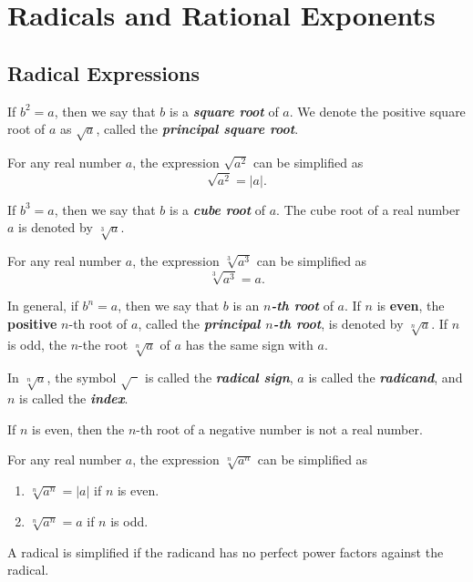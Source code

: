 
\hypertarget{radicals-and-rational-exponents}{%
\section{Radicals and Rational
Exponents}\label{radicals-and-rational-exponents}}

\hypertarget{radical-expressions}{%
\subsection{Radical Expressions}\label{radical-expressions}}

If \(b^2=a\), then we say that \(b\) is a \textbf{\emph{square root}} of
\(a\). We denote the positive square root of \(a\) as \(\sqrt{a}\),
called the \textbf{\emph{principal square root}}.

For any real number \(a\), the expression \(\sqrt{a^2}\) can be
simplified as \[
\sqrt{a^2}=|a|.
\]

If \(b^3=a\), then we say that \(b\) is a \textbf{\emph{cube root}} of
\(a\). The cube root of a real number \(a\) is denoted by
\(\sqrt[3]{a}\).

For any real number \(a\), the expression \(\sqrt[3]{a^3}\) can be
simplified as \[
\sqrt[3]{a^3}=a.
\]

In general, if \(b^n=a\), then we say that \(b\) is an
\textbf{\emph{\(n\)-th root}} of \(a\). If \(n\) is \textbf{even}, the
\textbf{positive} \(n\)-th root of \(a\), called the
\textbf{\emph{principal \(n\)-th root}}, is denoted by \(\sqrt[n]{a}\).
If \(n\) is odd, the \(n\)-the root \(\sqrt[n]{a}\) of \(a\) has the
same sign with \(a\).

In \(\sqrt[n]{a}\), the symbol \(\sqrt{\phantom{a}}\) is called the
\textbf{\emph{radical sign}}, \(a\) is called the
\textbf{\emph{radicand}}, and \(n\) is called the \textbf{\emph{index}}.

If \(n\) is even, then the \(n\)-th root of a negative number is not a
real number.

For any real number \(a\), the expression \(\sqrt[n]{a^n}\) can be
simplified as

\begin{enumerate}[sepno]
\item
  \(\sqrt[n]{a^n}=|a|\) if \(n\) is even.
\item
  \(\sqrt[n]{a^n}=a\) if \(n\) is odd.
\end{enumerate}

A radical is simplified if the radicand has no perfect power factors against the radical.

